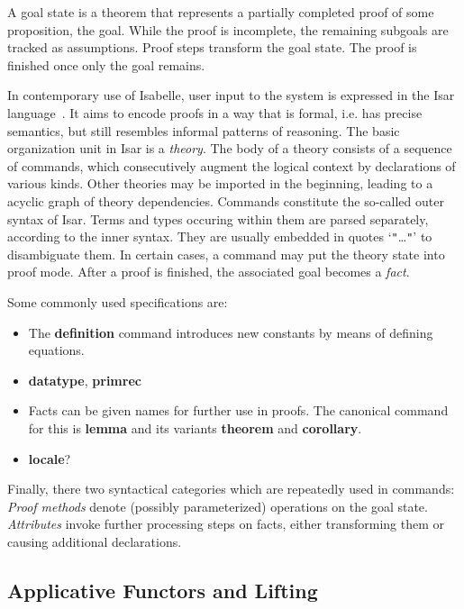 A goal state is a theorem that represents a partially completed proof of some
proposition, the goal.
While the proof is incomplete, the remaining subgoals are tracked as
assumptions.
Proof steps transform the goal state.
The proof is finished once only the goal remains.


In contemporary use of Isabelle, user input to the system is expressed in
the Isar language~\cite{wenzel99,wenzel02,isar-ref}.
It aims to encode proofs in a way that is formal, i.e. has precise semantics,
but still resembles informal patterns of reasoning.
The basic organization unit in Isar is a \emph{theory}.
The body of a theory consists of a sequence of commands, which consecutively
augment the logical context by declarations of various kinds.
Other theories may be imported in the beginning, leading to a acyclic graph
of theory dependencies.
Commands constitute the so-called outer syntax of Isar.
Terms and types occuring within them are parsed separately, according to the
inner syntax.
They are usually embedded in quotes `\texttt{"}\dots\texttt{"}' to disambiguate
them.
In certain cases, a command may put the theory state into proof mode.
After a proof is finished, the associated goal becomes a \emph{fact}.

Some commonly used specifications are:
\begin{itemize}
\item The \textbf{definition} command introduces new constants by means of
	defining equations.
\item \todo{} \textbf{datatype}, \textbf{primrec}
\item Facts can be given names for further use in proofs.
	The canonical command for this is \textbf{lemma} and its variants
	\textbf{theorem} and \textbf{corollary}.
\item \todo{} \textbf{locale}?
\end{itemize}

Finally, there two syntactical categories which are repeatedly used in commands:
\emph{Proof methods} denote (possibly parameterized) operations on the goal state.
\emph{Attributes} invoke further processing steps on facts, either transforming
them or causing additional declarations.




\subsection{Applicative Functors and Lifting}\label{subsec:applicative}

